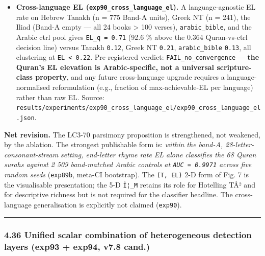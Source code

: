 \documentclass[
]{article}
\begin{document}
\begin{itemize}
  Source:
  \texttt{results/experiments/exp89b\_five\_feature\_ablation/exp89b\_five\_feature\_ablation.json}.
  Pre-registered verdict on the original ablation was
  \texttt{FAIL\_T\_dominates} under the strict
  \texttt{threshold\_single\ \textless{}\ 0.95} rule; the verdict label
  is retained in \texttt{exp89\_lc3\_ablation/exp89\_lc3\_ablation.json}
  but is an artefact of a pre-reg threshold set before the ablation ran.
  The honest finding is that EL alone sufficed, which is a
  \emph{simpler} and \emph{more portable} result than the 2-D or 5-D
  framing.
\item
  \textbf{Cross-language EL (\texttt{exp90\_cross\_language\_el}).} A
  language-agnostic EL rate on Hebrew Tanakh (n = 775 Band-A units),
  Greek NT (n = 241), the Iliad (Band-A empty --- all 24 books
  \textgreater{} 100 verses), \texttt{arabic\_bible}, and the Arabic
  ctrl pool gives \texttt{EL\_q\ =\ 0.71} (92.6 \% above the 0.364
  Quran-vs-ctrl decision line) versus Tanakh \texttt{0.12}, Greek NT
  \texttt{0.21}, \texttt{arabic\_bible} \texttt{0.13}, all clustering at
  \texttt{EL\ \textless{}\ 0.22}. Pre-registered verdict:
  \texttt{FAIL\_no\_convergence} --- \textbf{the Quran's EL elevation is
  Arabic-specific, not a universal scripture-class property}, and any
  future cross-language upgrade requires a language-normalised
  reformulation (e.g., fraction of max-achievable-EL per language)
  rather than raw EL. Source:
  \texttt{results/experiments/exp90\_cross\_language\_el/exp90\_cross\_language\_el.json}.
\end{itemize}

\textbf{Net revision.} The LC3-70 parsimony proposition is strengthened,
not weakened, by the ablation. The strongest publishable form is:
\emph{within the band-A, 28-letter-consonant-stream setting, end-letter
rhyme rate EL alone classifies the 68 Quran surahs against 2 509
band-matched Arabic controls at \texttt{AUC\ =\ 0.9971} across five
random seeds} (\texttt{exp89b}, meta-CI bootstrap). The
\texttt{(T,\ EL)} 2-D form of Fig. 7 is the visualisable presentation;
the 5-D \texttt{Î¦\_M} retains its role for Hotelling TÂ² and for
descriptive richness but is not required for the classifier headline.
The cross-language generalisation is explicitly not claimed
(\texttt{exp90}).

\begin{center}\rule{0.5\linewidth}{0.5pt}\end{center}

\subsubsection{4.36 Unified scalar combination of heterogeneous
detection layers (exp93 + exp94, v7.8
cand.)}\label{unified-scalar-combination-of-heterogeneous-detection-layers-exp93-exp94-v7.8-cand.}
\end{document}
